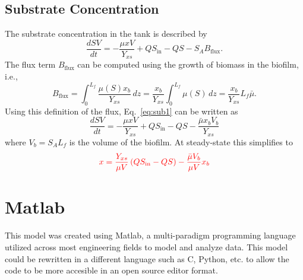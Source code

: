\documentclass[letterpaper, twoside]{article}
\numberwithin{equation}{section}
\newcommand{\ie}{i.e.}
\begin{document}
\subsection{Substrate Concentration}
The substrate concentration in the tank is described by
\begin{equation}\label{eq:sub1}
  \frac{dS V}{dt} = -\frac{\mu x V}{Y_{xs}} + Q S_{\mathrm{in}} - Q S - S_A B_{\mathrm{flux}}.
\end{equation}
The flux term $B_\mathrm{flux}$ can be computed using the growth of biomass in the biofilm, \ie,
\begin{equation}
  B_\mathrm{flux} = \int_0^{L_f} \frac{\mu(S) x_b}{Y_{xs}} \, dz = \frac{ x_b}{Y_{xs}}\int_0^{L_f} \mu(S) \, dz = \frac{ x_b}{Y_{xs}} L_f \bar{\mu}.
\end{equation}
 Using this definition of the flux, Eq.~\ref{eq:sub1} can be written as
\begin{equation}
  \frac{dS V}{dt} = -\frac{\mu x V}{Y_{xs}} + Q S_{\mathrm{in}} - Q S -\frac{\bar{\mu} x_b V_b}{Y_{xs}}
\end{equation}
where $V_b=S_A L_f$ is the volume of the biofilm.   At steady-state this simplifies to 
\begin{equation}
 {\color{red}
   x = \frac{Y_{xs}}{\mu V}\left(Q S_{\mathrm{in}} - Q S\right) -\frac{\bar{\mu} V_b}{\mu V}x_b}
\end{equation}

\section{Matlab}
This model was created using Matlab, a multi-paradigm programming language utilized across most engineering fields to model and analyze data. This model could be rewritten in a different language such as C, Python, etc. to allow the code to be more accesible in an open source editor format. 
\end{document}
